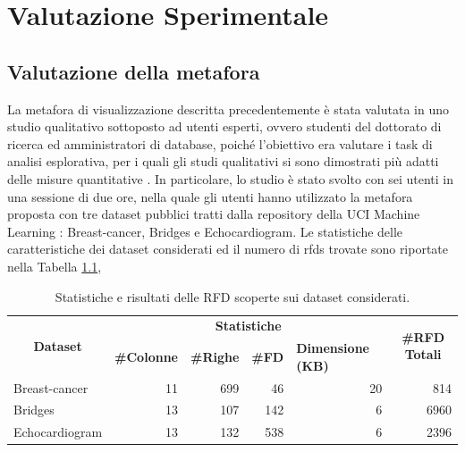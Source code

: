 \chapter{Valutazione Sperimentale}
\label{cap5:valutazione_sperimentale}
\section{Valutazione della metafora}
La metafora di visualizzazione descritta precedentemente \`{e} stata valutata \cite{mdvisualization} in uno studio qualitativo sottoposto ad utenti esperti, ovvero studenti del dottorato di ricerca ed amministratori di database, poich\'{e} l'obiettivo era valutare i task di analisi esplorativa, per i quali gli studi qualitativi si sono dimostrati pi\`{u} adatti delle misure quantitative \cite{informationvisualization,strategies4evaluatinginfo}. In particolare, lo studio \`{e} stato svolto con sei utenti in una sessione di due ore, nella quale gli utenti hanno utilizzato la metafora proposta con tre dataset pubblici tratti dalla repository della UCI Machine Learning \cite{ucirepository}: Breast-cancer, Bridges e Echocardiogram. Le statistiche delle caratteristiche dei dataset considerati ed il numero di \acrshort{rfds} trovate sono riportate nella Tabella \ref{table:1},
\begin{table}[h!]
\centering
\begin{tabular}{|l|rrrr|r|} 
\hline
\multicolumn{1}{|c|}{\multirow{2}{*}{\textbf{Dataset}}} & \multicolumn{4}{c|}{\textbf{Statistiche}}                                                                                              & \multicolumn{1}{c|}{\multirow{2}{*}{\textbf{\#RFD Totali}}}  \\
\multicolumn{1}{|c|}{}                         & \multicolumn{1}{l}{\textbf{\#Colonne}} & \multicolumn{1}{l}{\textbf{\#Righe}} & \multicolumn{1}{l}{\textbf{\#FD}} & \multicolumn{1}{l|}{\textbf{Dimensione (KB)}} & \multicolumn{1}{c|}{}                                \\ 
\hline
Breast-cancer                                  & 11                            & 699                         & 46                       & 20                                   & 814                                                  \\
Bridges                                        & 13                            & 107                         & 142                      & 6                                    & 6960                                                 \\
Echocardiogram                                 & 13                            & 132                         & 538                      & 6                                    & 2396                                                 \\
\hline
\end{tabular}
\caption{Statistiche e risultati delle RFD scoperte sui dataset considerati.}
\label{table:1}
\end{table}

